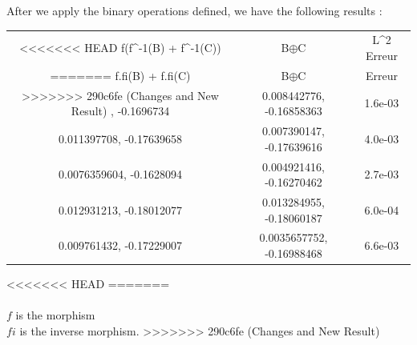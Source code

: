 \documentclass{report}
\begin{document}

            \newpage
            After we apply the binary operations defined, we have the following results :\\

            \begin{tabular}{|c|c|c|}
                \hline
<<<<<<< HEAD
                f(f^{-1}(B) + f^{-1}(C)) & B$\oplus$C & L^2 Erreur  \\
=======
                f.fi(B) + f.fi(C) & B$\oplus$C & Erreur \\
>>>>>>> 290c6fe (Changes and New Result)
                \hline
                0.009636102, -0.1696734 & 0.008442776, -0.16858363 & 1.6e-03 \\
                0.011397708, -0.17639658 & 0.007390147, -0.17639616 & 4.0e-03 \\
                0.0076359604, -0.1628094 & 0.004921416, -0.16270462 & 2.7e-03 \\
                0.012931213, -0.18012077 & 0.013284955, -0.18060187 & 6.0e-04 \\
                0.009761432, -0.17229007 & 0.0035657752, -0.16988468 & 6.6e-03 \\
                \hline
            \end{tabular}
<<<<<<< HEAD
=======
            \\
            \\
            $f$ is the morphism \\
            $fi$ is the inverse morphism.
>>>>>>> 290c6fe (Changes and New Result)
\end{document}
